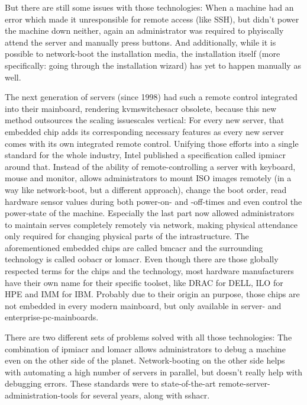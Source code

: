 But there are still some issues with those technologies:
When a machine had an error which made it unresponsible for remote access (like SSH), but didn't power the machine down neither, again an administrator was required to phyiscally attend the server and manually press buttons.
And additionally, while it is possible to network-boot the installation media, the installation itself (more specifically: going through the installation wizard) has yet to happen manually as well.

The next generation of servers (since 1998) had such a remote control integrated into their mainboard, rendering \gls{kvmswitchesacr} obsolete, because this new method outsources the scaling issuescales vertical: For every new server, that embedded chip adds its corresponding necessary features as every new server comes with its own integrated remote control. Unifying those efforts into a single standard for the whole industry, Intel published a specification called \gls{ipmiacr} around that. Instead of  the ability of remote-controlling a server with keyboard, mouse and monitor,  allows administrators to mount ISO images remotely (in a way like network-boot, but a different approach), change the boot order, read hardware sensor values during both power-on- and -off-times and even control the power-state of the machine. Especially the last part now allowed administrators to maintain serves completely remotely via network, making physical attendance only required for changing physical parts of the intrastructure. The aforementioned embedded chips are called \gls{bmcacr} and the surrounding technology is called \gls{oobacr} or \gls{lomacr}. Even though there are those globally respected terms for the chips and the technology, most hardware manufacturers have their own name for their specific toolset, like DRAC for DELL, ILO for HPE and IMM for IBM. Probably due to their origin an purpose, those chips are not embedded in every modern mainboard, but only available in server- and enterprise-pc-mainboards.

There are two different sets of problems solved with all those technologies:
The combination of \gls{ipmiacr} and \gls{lomacr} allows administrators to debug a machine even on the other side of the planet. %
Network-booting on the other side helps with automating a high number of servers in parallel, but doesn't really help with debugging errors.
These standards were to state-of-the-art remote-server-administration-tools for several years, along with \gls{sshacr}.


